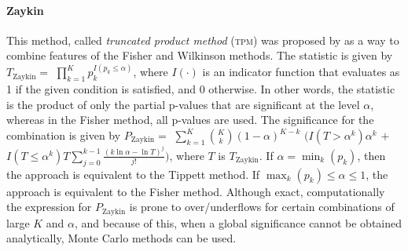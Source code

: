 \paragraph{Zaykin} This method, called \emph{truncated product method} (\textsc{tpm}) was proposed by \citet{Zaykin2002} as a way to combine features of the Fisher and Wilkinson methods. The statistic is given by $T_{\text{Zaykin}}=$ $\prod_{k=1}^{K} p_{k}^{I\left(p_{k} \leqslant \alpha\right)}$, where $I\left(\cdot\right)$ is an indicator function that evaluates as 1 if the given condition is satisfied, and 0 otherwise. In other words, the statistic is the product of only the partial p-values that are significant at the level $\alpha$, whereas in the Fisher method, all p-values are used. The significance for the combination is given by $P_{\text{Zaykin}} =$ $\sum_{k=1}^{K}\binom{K}{k}\left(1-\alpha\right)^{K-k}$ $\Big(I\left(T > \alpha^{k}\right) \alpha^{k}$ $+$ $I\left(T \leqslant \alpha^{k}\right)T\sum_{j=0}^{k-1}\frac{\left(k\ln \alpha - \ln T\right)^{j}}{j!}\Big)$, where $T$ is $T_{\text{Zaykin}}$.  If $\alpha = \min_{k}\left(p_{k}\right)$, then the approach is equivalent to the Tippett method. If $\max_{k}\left(p_{k}\right) \leqslant \alpha \leqslant 1$, the approach is equivalent to the Fisher method. Although exact, computationally the expression for $P_{\text{Zaykin}}$ is prone to over/underflows for certain combinations of large $K$ and $\alpha$, and because of this, when a global significance cannot be obtained analytically, Monte Carlo methods can be used.

